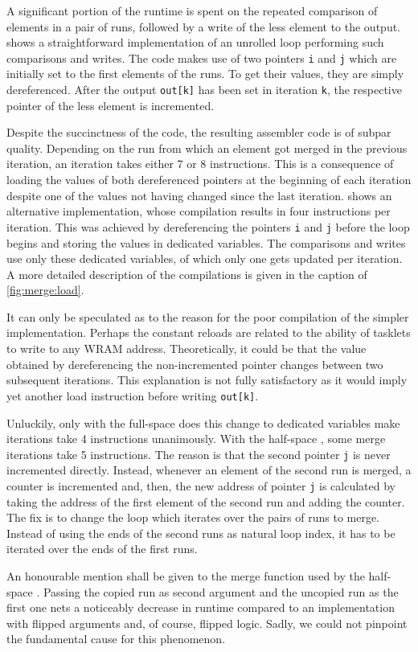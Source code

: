 \noindent
A significant portion of the runtime is spent on the repeated comparison of elements in a pair of runs, followed by a write of the less element to the output.
 shows a straightforward implementation of an unrolled loop performing such comparisons and writes.
The code makes use of two pointers \lstinline|i| and \lstinline|j| which are initially set to the first elements of the runs.
To get their values, they are simply dereferenced.
After the output \lstinline|out[k]| has been set in iteration \lstinline|k|, the respective pointer of the less element is incremented.

Despite the succinctness of the \langC{} code, the resulting assembler code is of subpar quality.
Depending on the run from which an element got merged in the previous iteration, an iteration takes either 7 or 8 instructions.
This is a consequence of loading the values of both dereferenced pointers at the beginning of each iteration despite one of the values not having changed since the last iteration.
 shows an alternative implementation, whose compilation results in four instructions per iteration.
This was achieved by dereferencing the pointers \lstinline|i| and \lstinline|j| before the loop begins and storing the values in dedicated variables.
The comparisons and writes use only these dedicated variables, of which only one gets updated per iteration.
A more detailed description of the compilations is given in the caption of \cref{fig:merge:load}.

It can only be speculated as to the reason for the poor compilation of the simpler implementation.
Perhaps the constant reloads are related to the ability of tasklets to write to any \ac{WRAM} address.
Theoretically, it could be that the value obtained by dereferencing the non-incremented pointer changes between two subsequent iterations.
This explanation is not fully satisfactory as it would imply yet another load instruction before writing \lstinline|out[k]|.

Unluckily, only with the full-space \MS{} does this change to dedicated variables make iterations take 4 instructions unanimously.
With the half-space \MS{}, some merge iterations take 5 instructions.
The reason is that the second pointer \lstinline|j| is never incremented directly.
Instead, whenever an element of the second run is merged, a counter is incremented and, then, the new address of pointer \lstinline|j| is calculated by taking the address of the first element of the second run and adding the counter.
The fix is to change the loop which iterates over the pairs of runs to merge.
Instead of using the ends of the second runs as natural loop index, it has to be iterated over the ends of the first runs.

An honourable mention shall be given to the merge function used by the half-space \MS{}.
Passing the copied run as second argument and the uncopied run as the first one nets a noticeably decrease in runtime compared to an implementation with flipped arguments and, of course, flipped logic.
Sadly, we could not pinpoint the fundamental cause for this phenomenon.
